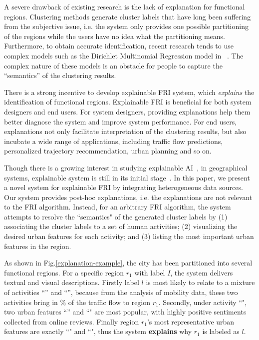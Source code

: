 \documentclass[runningheads]{llncs}
\begin{document}
A severe drawback of existing research is the lack of explanation for functional regions.
Clustering methods generate cluster labels that have long been suffering from the subjective issue, i.e. the system only provides one possible partitioning of the regions while the users have no idea what the partitioning means. 
Furthermore, to obtain accurate identification, recent research tends to use complex models such as the Dirichlet Multinomial Regression model in~\cite{Yuan2015FunctionRegion} . 
The complex nature of these models is an obstacle for people to capture the ``semantics'' of the clustering results. 

There is a strong incentive to develop explainable FRI system, which \emph{explains} the identification of functional regions. 
Explainable FRI is beneficial for both system designers and end users.
For system designers, providing explanations help them better diagnose the system and improve system performance. 
For end users, explanations not only facilitate interpretation of the clustering results, but also incubate a wide range of applications, including traffic flow predictions, personalized trajectory recommendation, urban planning and so on. 

Though there is a growing interest in studying explainable AI~\cite{Preece2018ExplainAI}, in geographical systems, explainable system is still in its initial stage~\cite{Korpan2017navigation,Jose2018cognitive}.
In this paper, we present a novel system for explainable FRI by integrating heterogeneous data sources. Our system provides post-hoc explanations, i.e. the explanations are not relevant to the FRI algorithm. Instead, for an arbitrary FRI algorithm, the system attempts to resolve the ``semantics" of the generated cluster labels by (1) associating the cluster labels to a set of human activities; (2) visualizing the desired urban features for each activity; and (3) listing the most important urban features in the region. 

As shown in Fig.\ref{explanation-example}, the city has been partitioned into several functional regions. For a specific region $r_1$ with label $I$, the system delivers textual and visual descriptions. Firstly label $l$ is most likely to relate to a mixture of activities ``'' and ``'', because from the analysis of mobility data, these two activities bring in $\%$ of the traffic flow to region $r_1$. Secondly, under activity ``", two urban features ``'' and ``" are most popular, with highly positive sentiments collected from online reviews. Finally region $r_1$'s most representative urban features are exactly ``" and ``", thus the system \textbf{explains} why $r_1$ is labeled as $l$.  
\end{document}
